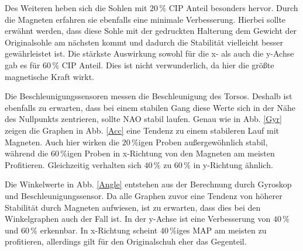 Des Weiteren heben sich die Sohlen mit $20\,\%$ CIP Anteil besonders hervor. Durch die Magneten erfahren sie ebenfalls eine minimale Verbesserung. Hierbei sollte erwähnt werden, dass diese Sohle mit der gedruckten Halterung dem Gewicht der Originalsohle am nächsten kommt und dadurch die Stabilität vielleicht besser gewährleistet ist. Die stärkste Auswirkung sowohl für die x- als auch die y-Achse gab es für $60\,\%$ CIP Anteil. Dies ist nicht verwunderlich, da hier die größte magnetische Kraft wirkt. 

Die Beschleunigungssensoren messen die Beschleunigung des Torsos. Deshalb ist ebenfalls zu erwarten, dass bei einem stabilen Gang diese Werte sich in der Nähe des Nullpunkts zentrieren, sollte NAO stabil laufen. Genau wie in Abb. \ref{Gyr} zeigen die Graphen in Abb. \ref{Acc} eine Tendenz zu einem stabileren Lauf mit Magneten. Auch hier wirken die $20\,\%$igen Proben außergewöhnlich stabil, während die $60\,\%$igen Proben in x-Richtung von den Magneten am meisten Profitieren. Gleichzeitig verhalten sich $40\,\%$ zu $60\,\%$ in y-Richtung ähnlich. 

Die Winkelwerte in Abb. \ref{Angle} entstehen aus der Berechnung durch Gyroskop und Beschleunigungssensor. Da alle Graphen zuvor eine Tendenz von höherer Stabilität durch Magneten aufwiesen, ist zu erwarten, dass dies bei den Winkelgraphen auch der Fall ist. In der y-Achse ist eine Verbesserung von $40\,\%$ und $60\,\%$ erkennbar. In x-Richtung scheint $40\,\%$iges MAP am meisten zu profitieren, allerdings gilt für den Originalschuh eher das Gegenteil. 







